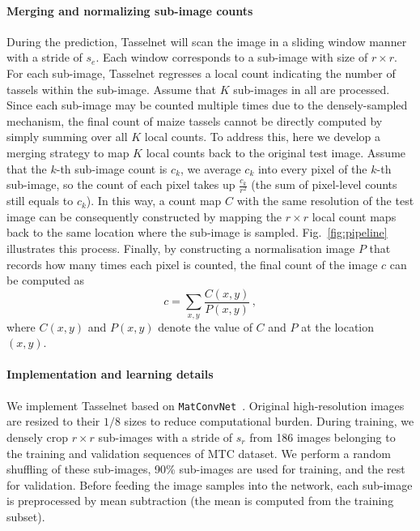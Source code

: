 \documentclass[twocolumn]{bmcart}%
\begin{document}
\paragraph{Merging and normalizing sub-image counts}
%
During the prediction, Tasselnet will scan the image in a sliding window manner with a stride of $s_e$. Each window corresponds to a sub-image with size of $r\times r$. For each sub-image, Tasselnet regresses a local count indicating the number of tassels within the sub-image. Assume that $K$ sub-images in all are processed. Since each sub-image may be counted multiple times due to the densely-sampled mechanism, the final count of maize tassels cannot be directly computed by simply summing over all $K$ local counts. To address this, here we develop a merging strategy to map $K$ local counts back to the original test image. Assume that the $k$-th sub-image count is $c_k$, we average $c_k$ into every pixel of the $k$-th sub-image, so the count of each pixel takes up $\frac{c_k}{r^2}$ (the sum of pixel-level counts still equals to $c_k$). In this way, a count map $C$ with the same resolution of the test image can be consequently constructed by mapping the $r\times r$ local count maps back to the same location where the sub-image is sampled. Fig.~\ref{fig:pipeline} illustrates this process. Finally, by constructing a normalisation image $P$ that records how many times each pixel is counted, the final count of the image $c$ can be computed as
\begin{equation}\label{eq:count}
c=\sum_{x,y}\frac{C(x,y)}{P(x,y)}\,,
\end{equation}
where $C(x,y)$ and $P(x,y)$ denote the value of $C$ and $P$ at the location $(x,y)$.

\paragraph{Implementation and learning details}
%
We implement Tasselnet based on \texttt{MatConvNet}~\cite{Vedaldi2015conv}. Original high-resolution images are resized to their $1/8$ sizes to reduce computational burden. During training, we densely crop $r\times r$ sub-images with a stride of $s_r$ from 186 images belonging to the training and validation sequences of MTC dataset. We perform a random shuffling of these sub-images, 90\% sub-images are used for training, and the rest for validation. Before feeding the image samples into the network, each sub-image is preprocessed by mean subtraction (the mean is computed from the training subset).
\end{document}
